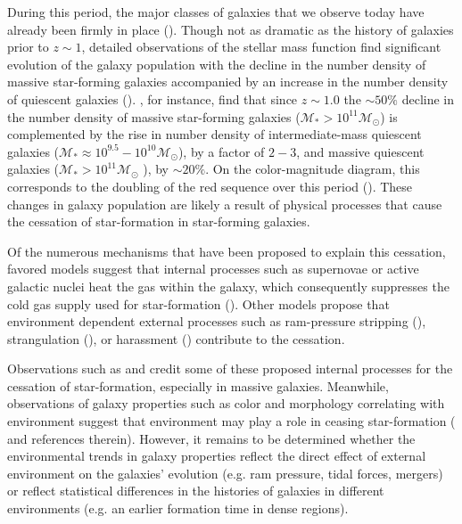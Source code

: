 \documentclass{emulateapj}
\begin{document}
During this period, the major classes of galaxies that we observe today have already been firmly in place (\citealt{bundy06a, borch06a, taylor09a, Moustakas:2013aa}). Though not as dramatic as the history of galaxies prior to $z \sim 1$, detailed observations of the stellar mass function find significant evolution of the galaxy population with the decline in the number density of massive star-forming galaxies accompanied by an increase in the number density of quiescent galaxies (\citealt{Blanton:2006aa, bundy06a,  borch06a, Moustakas:2013aa}). \cite{Moustakas:2013aa}, for instance, find that since $z \sim 1.0$ the $\sim 50\%$ decline in the number density of massive star-forming galaxies ($\mathcal{M}_{*} > 10^{11} \mathcal{M}_{\odot}$) is complemented by the rise in number density of intermediate-mass quiescent galaxies ($\mathcal{M}_{*} \approx 10^{9.5} - 10^{10}\mathcal{M}_{\odot}$), by a factor of $ 2-3$, and massive quiescent galaxies ($\mathcal{M}_{*} > 10^{11} \mathcal{M}_{\odot}$ ), by $\sim 20\%$. On the color-magnitude diagram, this corresponds to the doubling of the red sequence over this period (\citealt{Bell:2004aa, borch06a, Faber:2007aa}). These changes in galaxy population are likely a result of physical processes that cause the cessation of star-formation in star-forming galaxies. 

Of the numerous mechanisms that have been proposed to explain this cessation, favored models suggest that internal processes such as supernovae or active galactic nuclei heat the gas within the galaxy, which consequently suppresses the cold gas supply used for star-formation (\citealt{Keres:2005aa, Croton:2006aa, Dekel:2008aa}). Other models propose that environment dependent external processes such as ram-pressure stripping (\citealt{Gunn:1972aa, Bekki:2009aa}), strangulation (\citealt{Larson:1980aa, Balogh:2000aa}), or harassment (\citealt{Moore:1998aa}) contribute to the cessation. 

Observations such as \cite{Weinmann:2006aa} and \cite{Peng:2010aa} credit some of these proposed internal processes for the cessation of star-formation, especially in massive galaxies. Meanwhile, observations of galaxy properties such as color and morphology correlating with environment suggest that environment may play a role in ceasing star-formation (\citealt{blanton09a} and references therein). However, it remains to be determined whether the environmental trends in galaxy properties reflect the direct effect of external environment on the galaxies' evolution (e.g. ram pressure, tidal forces, mergers) or reflect statistical differences in the histories of galaxies in different environments (e.g. an earlier formation time in dense regions).
\end{document}
